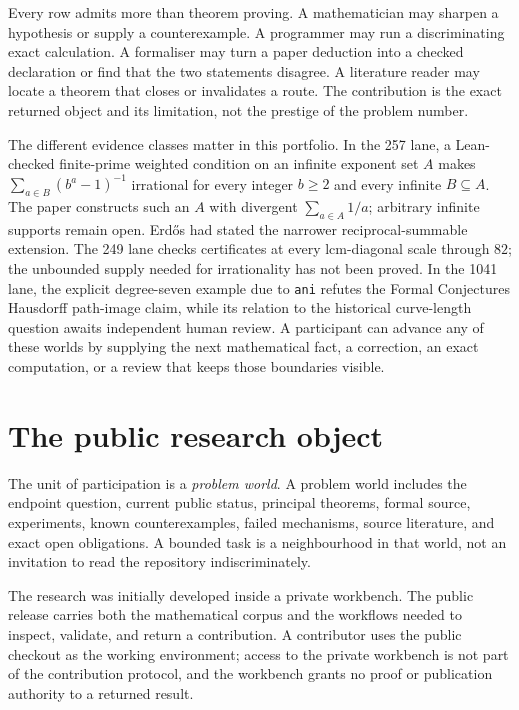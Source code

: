 \documentclass[10pt]{article}
\begin{document}
Every row admits more than theorem proving.  A mathematician may sharpen a
hypothesis or supply a counterexample.  A programmer may run a discriminating
exact calculation.  A formaliser may turn a paper deduction into a checked
declaration or find that the two statements disagree.  A literature reader
may locate a theorem that closes or invalidates a route.  The contribution is
the exact returned object and its limitation, not the prestige of the problem
number.

The different evidence classes matter in this portfolio. In the 257 lane, a
Lean-checked finite-prime weighted condition on an infinite exponent set
$A$ makes $\sum_{a\in B}(b^a-1)^{-1}$ irrational for every integer $b\ge2$
and every infinite $B\subseteq A$. The paper constructs such an $A$ with
divergent $\sum_{a\in A}1/a$; arbitrary infinite supports remain open.
Erd\H{o}s had stated the narrower reciprocal-summable extension.
The 249 lane checks certificates at every lcm-diagonal scale through $82$;
the unbounded supply needed for irrationality has not been proved. In the
1041 lane, the explicit degree-seven example due to \texttt{ani} refutes the
Formal Conjectures Hausdorff path-image claim, while its relation to the historical
curve-length question awaits independent human review. A participant can
advance any of these worlds by supplying the next mathematical fact, a
correction, an exact computation, or a review that keeps those boundaries
visible.

\section{The public research object}\label{sec:object}

The unit of participation is a \emph{problem world}.  A problem world includes
the endpoint question, current public status, principal theorems, formal
source, experiments, known counterexamples, failed mechanisms, source
literature, and exact open obligations.  A bounded task is a neighbourhood in
that world, not an invitation to read the repository indiscriminately.

The research was initially developed inside a private workbench.  The public
release carries both the mathematical corpus and the workflows needed to
inspect, validate, and return a contribution.  A contributor uses the public
checkout as the working environment; access to the private workbench is not
part of the contribution protocol, and the workbench grants no proof or
publication authority to a returned result.
\end{document}
